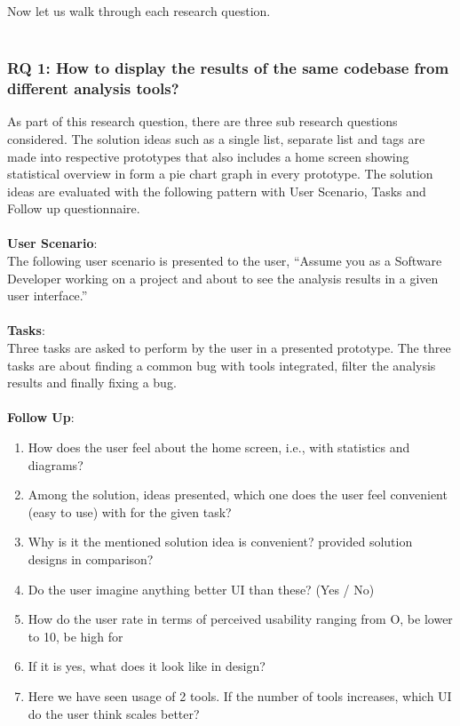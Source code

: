 Now let us walk through each research question. \\ \\


\subsubsection{RQ 1: How to display the results of the same codebase from different analysis tools?}

As part of this research question, there are three sub research questions considered. The solution ideas such as a single list, separate list and tags are made into respective prototypes that also includes a home screen showing statistical overview in form a pie chart graph in every prototype. The solution ideas are evaluated with the following pattern with User Scenario, Tasks and Follow up questionnaire. \\ \\

\textbf{User Scenario}: \\

The following user scenario is presented to the user, “Assume you as a Software Developer working on a project and about to see the analysis results in a given user interface.” \\ \\

\textbf{Tasks}: \\

Three tasks are asked to perform by the user in a presented prototype. The three tasks are about finding a common bug with tools integrated, filter the analysis results and finally fixing a bug. \\ \\

\textbf{Follow Up}: \\

\begin{enumerate}
\item How does the user feel about the home screen, i.e., with statistics and diagrams? 
\item Among the solution, ideas presented, which one does the user feel convenient (easy to use) with for the given task?
\item Why is it the mentioned solution idea is convenient? provided solution designs in comparison?
\item Do the user imagine anything better UI than these? (Yes / No)
\item How do the user rate in terms of perceived usability ranging from O, be lower to 10, be high for
\item If it is yes, what does it look like in design?
\item Here we have seen usage of 2 tools. If the number of tools increases, which UI do the user think scales better?
\end{enumerate}


